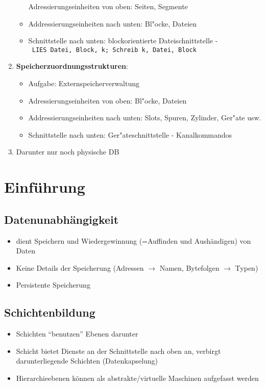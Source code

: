 \documentclass[a4paper, 12pt]{scrartcl}
\begin{document}
\begin{enumerate}
\begin{itemize}
				Adressierungseinheiten von oben: Seiten, Segmente
			\item
				Addressierungseinheiten nach unten: Bl"ocke, Dateien
			\item
				Schnittstelle nach unten: blockorientierte Dateischnittstelle - \\ \lstinline$ LIES Datei, Block, k; Schreib k, Datei, Block$
		\end{itemize}
	\item
		\textbf{Speicherzuordnungsstrukturen}:
		\begin{itemize}
			\item
				Aufgabe: Externspeicherverwaltung
			\item
				Adressierungseinheiten von oben: Bl"ocke, Dateien
			\item
				Addressierungseinheiten nach unten: Slots, Spuren, Zylinder, Ger"ate usw.
			\item
				Schnittstelle nach unten: Ger"ateschnittstelle - Kanalkommandos
		\end{itemize}
	\item
		Darunter nur noch physische DB
\end{enumerate}




\newpage
\section{Einführung}
\subsection{Datenunabhängigkeit}
\begin{itemize}
	\item
		dient Speichern und Wiedergewinnung (=Auffinden und Aushändigen) von Daten
	\item
		Keine Details der Speicherung (Adressen $\rightarrow$ Namen, Bytefolgen $\rightarrow$ Typen)
	\item
		Persistente Speicherung
\end{itemize}
\subsection{Schichtenbildung}
\begin{itemize}
	\item Schichten \enquote{benutzen} Ebenen darunter
	\item Schicht bietet Dienste an der Schnittstelle nach oben an, verbirgt darunterliegende Schichten (Datenkapselung)
	\item
		Hierarchieebenen können als abstrakte/virtuelle Maschinen aufgefasst werden
\end{itemize}
\end{document}
